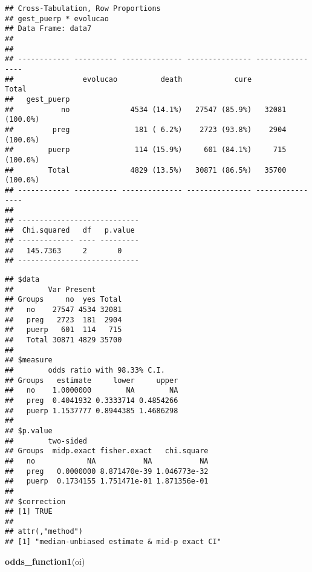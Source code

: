 \documentclass[
]{article}
\newenvironment{Shaded}{\begin{snugshade}}{\end{snugshade}}
\newcommand{\KeywordTok}[1]{\textcolor[rgb]{0.13,0.29,0.53}{\textbf{#1}}}
\newcommand{\NormalTok}[1]{#1}
\newcommand{\OperatorTok}[1]{\textcolor[rgb]{0.81,0.36,0.00}{\textbf{#1}}}
\newcommand{\StringTok}[1]{\textcolor[rgb]{0.31,0.60,0.02}{#1}}
\begin{document}
\begin{verbatim}
## Cross-Tabulation, Row Proportions  
## gest_puerp * evolucao  
## Data Frame: data7  
## 
## 
## ------------ ---------- -------------- --------------- ----------------
##                evolucao          death            cure            Total
##   gest_puerp                                                           
##           no              4534 (14.1%)   27547 (85.9%)   32081 (100.0%)
##         preg               181 ( 6.2%)    2723 (93.8%)    2904 (100.0%)
##        puerp               114 (15.9%)     601 (84.1%)     715 (100.0%)
##        Total              4829 (13.5%)   30871 (86.5%)   35700 (100.0%)
## ------------ ---------- -------------- --------------- ----------------
## 
## ----------------------------
##  Chi.squared   df   p.value 
## ------------- ---- ---------
##   145.7363     2       0    
## ----------------------------
\end{verbatim}

\begin{Shaded}
\end{Shaded}

\begin{verbatim}
## $data
##        Var Present
## Groups     no  yes Total
##   no    27547 4534 32081
##   preg   2723  181  2904
##   puerp   601  114   715
##   Total 30871 4829 35700
## 
## $measure
##        odds ratio with 98.33% C.I.
## Groups   estimate     lower     upper
##   no    1.0000000        NA        NA
##   preg  0.4041932 0.3333714 0.4854266
##   puerp 1.1537777 0.8944385 1.4686298
## 
## $p.value
##        two-sided
## Groups  midp.exact fisher.exact   chi.square
##   no            NA           NA           NA
##   preg   0.0000000 8.871470e-39 1.046773e-32
##   puerp  0.1734155 1.751471e-01 1.871356e-01
## 
## $correction
## [1] TRUE
## 
## attr(,"method")
## [1] "median-unbiased estimate & mid-p exact CI"
\end{verbatim}

\begin{Shaded}
\begin{Highlighting}[]
\KeywordTok{odds_function1}\NormalTok{(oi)}
\end{Highlighting}
\end{Shaded}
\end{document}
